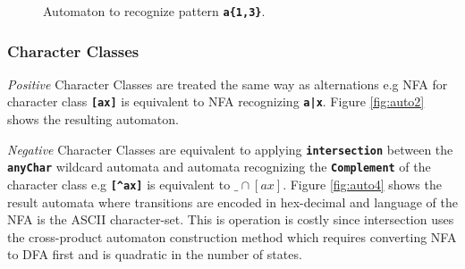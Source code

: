 \begin{figure}[H]
\centering
{}
\caption{Automaton to recognize pattern \texttt{\textbf{a\{1,3\}}}.}
\label{fig:autoq4}
\end{figure}


\subsubsection{Character Classes}
\textit{Positive} Character Classes are treated the same way as alternations e.g NFA for character class \texttt{\textbf{[ax]}} is equivalent to NFA recognizing \texttt{\textbf{a|x}}. Figure \ref{fig:auto2} shows the resulting automaton.

\noindent
\textit{Negative} Character Classes are equivalent to applying \texttt{\textbf{intersection}} between the \texttt{\textbf{anyChar}} wildcard automata and automata recognizing the \texttt{\textbf{Complement}} of the character class e.g \texttt{\textbf{[\textasciicircum ax]}} is equivalent to \texttt{\textbf{$\_ \cap [ax]$}}. Figure \ref{fig:auto4} shows the result automata where transitions are encoded in hex-decimal and language of the NFA is the ASCII character-set. This is operation is costly since intersection uses the cross-product automaton construction method which requires converting NFA to DFA first and is quadratic in the number of states.


